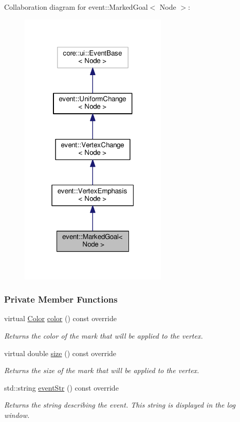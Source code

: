 Collaboration diagram for event\+:\+:Marked\+Goal$<$ Node $>$\+:\nopagebreak
\begin{figure}[H]
\begin{center}
\leavevmode
\includegraphics[width=199pt]{structevent_1_1MarkedGoal__coll__graph}
\end{center}
\end{figure}
\subsubsection*{Private Member Functions}
\begin{DoxyCompactItemize}
\item 
virtual \hyperlink{colors_8h_ab87bacfdad76e61b9412d7124be44c1c}{Color} \hyperlink{structevent_1_1MarkedGoal_a8598bc6d750ad378149cca8f1e635ba8}{color} () const override
\begin{DoxyCompactList}\small\item\em Returns the color of the mark that will be applied to the vertex. \end{DoxyCompactList}\item 
virtual double \hyperlink{structevent_1_1MarkedGoal_a428f40eb708919e50ad1956bc466bdbe}{size} () const override
\begin{DoxyCompactList}\small\item\em Returns the size of the mark that will be applied to the vertex. \end{DoxyCompactList}\item 
std\+::string \hyperlink{structevent_1_1MarkedGoal_abc51eab06660e9b3516a31f1228a9562}{event\+Str} () const override
\begin{DoxyCompactList}\small\item\em Returns the string describing the event. This string is displayed in the log window. \end{DoxyCompactList}\end{DoxyCompactItemize}
